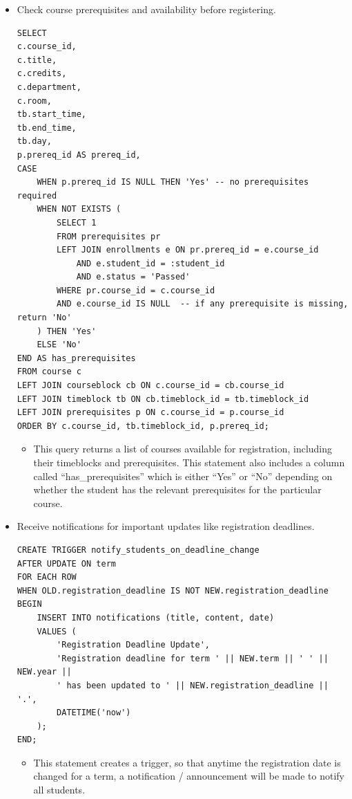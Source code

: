 \documentclass{report}
\begin{document}
\begin{itemize}
    \item Check course prerequisites and availability before registering.
    \begin{lstlisting}
SELECT
c.course_id,
c.title,
c.credits,
c.department,
c.room,
tb.start_time,
tb.end_time,
tb.day,
p.prereq_id AS prereq_id,
CASE
    WHEN p.prereq_id IS NULL THEN 'Yes' -- no prerequisites required
    WHEN NOT EXISTS (
        SELECT 1
        FROM prerequisites pr
        LEFT JOIN enrollments e ON pr.prereq_id = e.course_id
            AND e.student_id = :student_id
            AND e.status = 'Passed'
        WHERE pr.course_id = c.course_id
        AND e.course_id IS NULL  -- if any prerequisite is missing, return 'No'
    ) THEN 'Yes'
    ELSE 'No'
END AS has_prerequisites
FROM course c
LEFT JOIN courseblock cb ON c.course_id = cb.course_id
LEFT JOIN timeblock tb ON cb.timeblock_id = tb.timeblock_id
LEFT JOIN prerequisites p ON c.course_id = p.course_id
ORDER BY c.course_id, tb.timeblock_id, p.prereq_id;
    \end{lstlisting}
    \begin{itemize}
        \item This query returns a list of courses available for registration, including their timeblocks and prerequisites. This statement also includes a column called ``has\_prerequisites'' which is either ``Yes'' or ``No'' depending on whether the student has the relevant prerequisites for the particular course.
    \end{itemize}

    \item Receive notifications for important updates like registration deadlines.
    \begin{lstlisting}
CREATE TRIGGER notify_students_on_deadline_change
AFTER UPDATE ON term
FOR EACH ROW
WHEN OLD.registration_deadline IS NOT NEW.registration_deadline
BEGIN
    INSERT INTO notifications (title, content, date) 
    VALUES (
        'Registration Deadline Update', 
        'Registration deadline for term ' || NEW.term || ' ' || NEW.year ||
        ' has been updated to ' || NEW.registration_deadline || '.',
        DATETIME('now')
    );
END;
    \end{lstlisting}
    \begin{itemize}
        \item This statement creates a trigger, so that anytime the registration date is changed for a term, a notification / announcement will be made to notify all students.
    \end{itemize}


\end{itemize}
\end{document}
